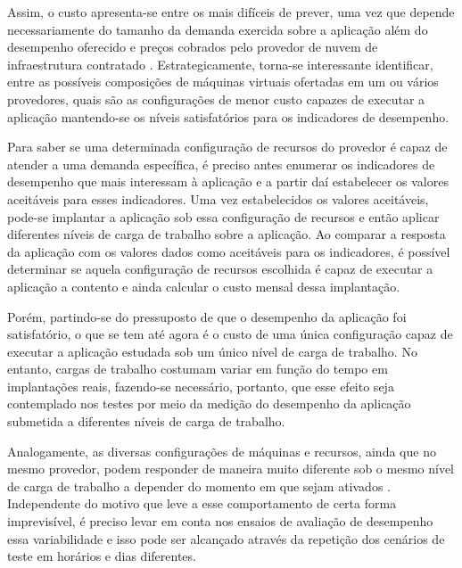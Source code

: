Assim, o custo apresenta-se entre os mais difíceis de prever, uma vez que depende necessariamente 
do tamanho da demanda exercida sobre a aplicação além do desempenho oferecido e preços cobrados 
pelo provedor de nuvem de infraestrutura contratado \cite{cunha2012ambiente}. Estrategicamente, 
torna-se interessante identificar, entre as possíveis composições de máquinas virtuais ofertadas 
em um ou vários provedores, quais são as configurações de menor custo capazes de executar a 
aplicação mantendo-se os níveis satisfatórios para os indicadores de desempenho.

Para saber se uma determinada configuração de recursos do provedor é capaz de atender a uma 
demanda específica, é preciso antes enumerar os indicadores de desempenho que mais interessam 
à aplicação e a partir daí estabelecer os valores aceitáveis para esses indicadores. Uma vez 
estabelecidos os valores aceitáveis, pode-se implantar a aplicação sob essa configuração de 
recursos e então aplicar diferentes níveis de carga de trabalho sobre a aplicação. Ao comparar 
a resposta da aplicação com os valores dados como aceitáveis para os indicadores, é possível 
determinar se aquela configuração de recursos escolhida é capaz de executar a aplicação a 
contento e ainda calcular o custo mensal dessa implantação.

Porém, partindo-se do pressuposto de que o desempenho da aplicação foi satisfatório, o que se 
tem até agora é o custo de uma única configuração capaz de executar a aplicação estudada sob 
um único nível de carga de trabalho. No entanto, cargas de trabalho costumam variar em função do tempo 
em implantações reais, fazendo-se necessário, portanto, que esse efeito seja contemplado nos 
testes por meio da medição do desempenho da aplicação submetida a diferentes níveis de carga 
de trabalho.

Analogamente, as diversas configurações de máquinas e recursos, ainda que no mesmo provedor, 
podem responder de maneira muito diferente sob o mesmo nível de carga de trabalho a depender 
do momento em que sejam ativados \cite{cunha2011investigating, iosup2011performance, 
jayasinghe2011variations}. Independente do motivo que leve a esse comportamento de certa 
forma imprevisível, é preciso levar em conta nos ensaios de avaliação de desempenho essa 
variabilidade e isso pode ser alcançado através da repetição dos cenários de teste em horários 
e dias diferentes.

